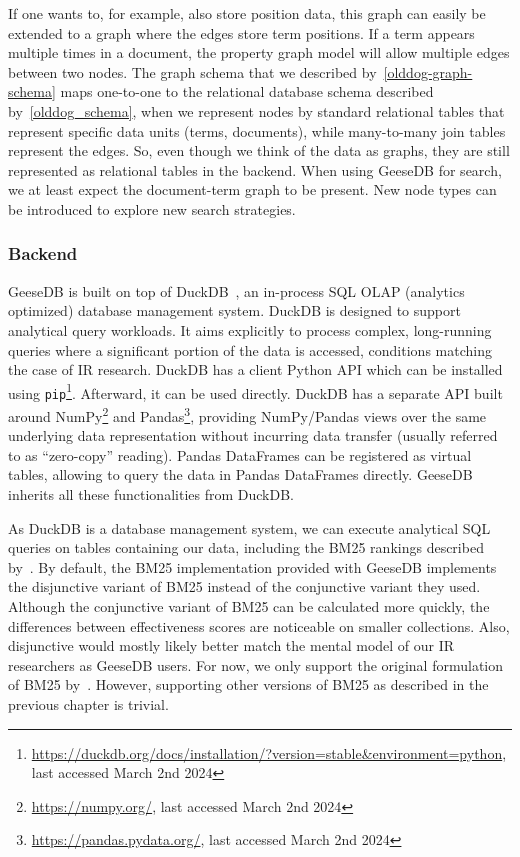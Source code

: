 If one wants to, for example, also store position data, this graph can easily be extended to a graph where the edges store term positions. If a term appears multiple times in a document, the property graph model will allow multiple edges between two nodes. The graph schema that we described by~\cref{olddog-graph-schema} maps one-to-one to the relational database schema described by~\cref{olddog_schema}, when we represent nodes by standard relational tables that represent specific data units (terms, documents), while many-to-many join tables represent the edges. So, even though we think of the data as graphs, they are still represented as relational tables in the backend. When using GeeseDB for search, we at least expect the document-term graph to be present. New node types can be introduced to explore new search strategies. 

\subsubsection{Backend}
GeeseDB is built on top of DuckDB~\citep{duckdb}, an in-process SQL OLAP (analytics optimized) database management system. DuckDB is designed to support analytical query workloads. It aims explicitly to process complex, long-running queries where a significant portion of the data is accessed, conditions matching the case of IR research. DuckDB has a client Python API which can be installed using \texttt{pip}\footnote{\url{https://duckdb.org/docs/installation/?version=stable&environment=python}, last accessed March 2nd 2024}. Afterward, it can be used directly. DuckDB has a separate API built around NumPy\footnote{\url{https://numpy.org/}, last accessed March 2nd 2024} and Pandas\footnote{\url{https://pandas.pydata.org/}, last accessed March 2nd 2024}, providing NumPy/Pandas views over the same underlying data representation without incurring data transfer (usually referred to as ``zero-copy'' reading). Pandas DataFrames can be registered as virtual tables, allowing to query the data in Pandas DataFrames directly. GeeseDB inherits all these functionalities from DuckDB.

As DuckDB is a database management system, we can execute analytical SQL queries on tables containing our data, including the BM25 rankings described by~\citet{OldDog}. By default, the BM25 implementation provided with GeeseDB implements the disjunctive variant of BM25 instead of the conjunctive variant they used. Although the conjunctive variant of BM25 can be calculated more quickly, the differences between effectiveness scores are noticeable on smaller collections. Also, disjunctive would mostly likely better match the mental model of our IR researchers as GeeseDB users. For now, we only support the original formulation of BM25 by~\citet{bm25-robertson}. However, supporting other versions of BM25 as described in the previous chapter is trivial.

